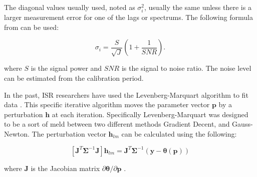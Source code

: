 %
%



The diagonal values usually used, noted as $\sigma_i^2$, usually the same unless there is a larger measurement error for one of the lags or spectrums.  The following formula from  \cite{nicollsisrschool2013} can be used:

\begin{equation}
\label{sigpow}
\sigma_i = \frac{S}{\sqrt{J}}\left(1+\frac{1}{SNR}\right).
\end{equation}

\noindent where $S$ is the signal power and $SNR$ is the signal to noise ratio. The noise level can be estimated from the calibration period. 

In the past, ISR researchers have used the Levenberg-Marquart algorithm to fit data \cite{nikoukar2008}. This specific iterative algorithm moves the parameter vector $\mathbf{p}$ by a perturbation $\mathbf{h}$ at each iteration\cite{gavin:2013}. Specifically Levenberg-Marquart was designed to be a sort of meld between two different methods Gradient Decent, and Gauss-Newton. The perturbation vector $\mathbf{h}_{lm}$ can be calculated using the following:

\begin{equation}
\left[ \mathbf{J}^T\bm{\Sigma}^{-1}\mathbf{J}\right]\mathbf{h}_{lm} =\mathbf{J}^T\bm{\Sigma}^{-1}(\mathbf{y}-\bm{\theta}(\mathbf{p}))
\label{hlm}
\end{equation}

\noindent where $\mathbf{J}$ is the Jacobian matrix $\partial \bm{\theta}/\partial \mathbf{p}$ \cite{levenberg1944,marquardt:1963}. 


